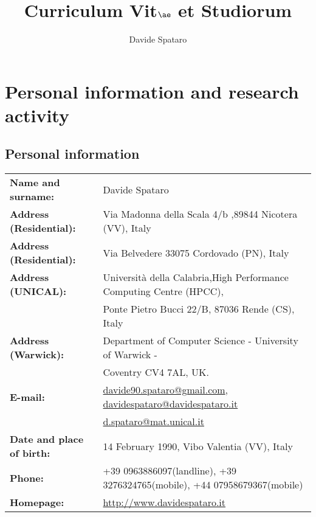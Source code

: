 \documentclass[a4paper,10pt]{article}
\title{Curriculum Vit$\ae$ et Studiorum}
\author{Davide Spataro}
\begin{document}
\maketitle

\tableofcontents

\newpage

\section{Personal information and research activity}

\subsection{Personal information}

\begin{table}[h]
\begin{tabular}{l l}
\textbf{Name and surname:} & Davide Spataro \\
\textbf{Address (Residential):} & Via Madonna della Scala 4/b ,89844 Nicotera
(VV), Italy \\
\textbf{Address (Residential):} & Via Belvedere 33075 Cordovado (PN), Italy
\\
\textbf{Address (UNICAL):} & Universit\`a della Calabria,High Performance
Computing Centre (HPCC),\\&  Ponte Pietro Bucci 22/B, 87036 Rende (CS),
Italy
\\
\textbf{Address (Warwick):} & Department of Computer Science -  University
of Warwick -\\
& Coventry CV4 7AL, UK.
\\
\textbf{E-mail:} &
\href{mailto:davide90.spataro@gmail.com}{davide90.spataro@gmail.com},
\href{mailto:davidespataro@davidespataro.it}{davidespataro@davidespataro.it}\\&
\href{mailto:d.spataro@mat.unical.it}{d.spataro@mat.unical.it}
\\
\textbf{Date and place of birth:} & 14 February 1990, Vibo Valentia (VV),
Italy \\
\textbf{Phone: }& +39 0963886097(landline), +39 3276324765(mobile),
+44 07958679367(mobile) \\
\textbf{Homepage: }& \url{http://www.davidespataro.it} \\
\end{tabular}
\end{table}

\begin{center}
\mbox{}
\end{center}
 
\end{document}

